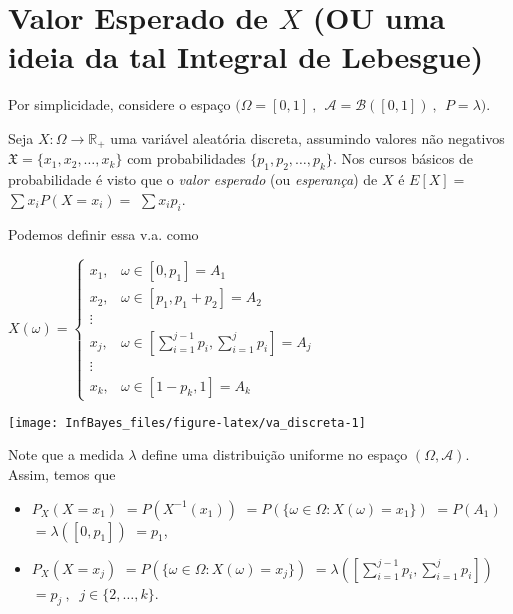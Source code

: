 \documentclass[
]{book}
\begin{document}
\(~\)

\(~\)

\hypertarget{lebesgue}{%
\section{\texorpdfstring{Valor Esperado de \(X\) (OU uma ideia da tal Integral de Lebesgue)}{Valor Esperado de X (OU uma ideia da tal Integral de Lebesgue)}}\label{lebesgue}}

Por simplicidade, considere o espaço \(\Big(\Omega = [0,1]~,~~ \mathcal{A} = \mathcal{B}\left([0,1]\right)~,~~ P=\lambda\Big)\).

Seja \(X: \Omega \longrightarrow \mathbb{R}_+\) uma variável aleatória discreta, assumindo valores não negativos \(\mathfrak{X}=\{x_1,x_2,\ldots,x_k\}\) com probabilidades \(\{p_1,p_2,\ldots,p_k\}\). Nos cursos básicos de probabilidade é visto que o \emph{valor esperado} (ou \emph{esperança}) de \(X\) é \(E[X] =\) \(\sum x_i P(X=x_i) =\) \(\sum x_i p_i\).

Podemos definir essa v.a. como

\(X(\omega) = \left\{\begin{array}{ll} x_1, & \omega \in [0,p_1] = A_1 \\  x_2, & \omega \in [p_1,p_1+p_2] = A_2 \\  \vdots & \\  x_j, & \omega \in \left[\displaystyle\sum_{i=1}^{j-1} p_i,\sum_{i=1}^{j} p_i\right] = A_j \\  \vdots & \\  x_k, & \omega \in [1-p_k,1] = A_k \end{array}\right.\)

\begin{center}\texttt{[image: InfBayes\_files/figure-latex/va\_discreta-1]} \end{center}

Note que a medida \(\lambda\) define uma distribuição uniforme no espaço \((\Omega,\mathcal{A})\). Assim, temos que

\begin{itemize}
\item
  \(P_X(X=x_1)\) \(=P\left(X^{-1}(x_1)\right)\) \(=P\left(\{\omega \in \Omega : X(\omega)=x_1\}\right)\) \(=P(A_1)\) \(=\lambda\left([0,p_1]\right)\) \(=p_1\),
\item
  \(P_X(X=x_j)\) \(=P\left(\{\omega \in \Omega : X(\omega)=x_j\}\right)\) \(=\lambda\left(\left[\sum_{i=1}^{j-1} p_i,\sum_{i=1}^{j} p_i\right]\right)\) \(=p_j ~,~\) \(j \in \{2,\ldots,k\}\).
\end{itemize}
\end{document}
